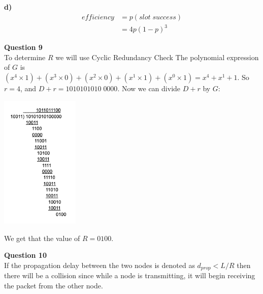 \documentclass{article}
\begin{document}
\smallskip
{\bf d)}\\
\begin{equation*}
\begin{split}
    efficiency &= p(slot \; success)\\
    &= 4p(1-p)^3
\end{split}
\end{equation*} 

{\bf Question 9}\\
To determine $R$ we will use Cyclic Redundancy Check The polynomial expression of $G$ is $(x^4 \times 1) +  (x^3 \times 0) + (x^2 \times 0) + (x^1 \times 1) + (x^0 \times 1) = x^4+x^1+1$. So $r=4$, and $D+r=1010101010 \; 0000$. Now we can divide $D+r$ by $G$:
\begin{center}
    \includegraphics[width=0.28\textwidth]{8.png}
\end{center}
We get that the value of $R=0100$.

\bigskip
{\bf Question 10}\\
If the propagation delay between the two nodes is denoted as $d_{prop}<L/R$ then there will be a collision since while a node is transmitting, it will begin receiving the packet from the other node. 
\end{document}
